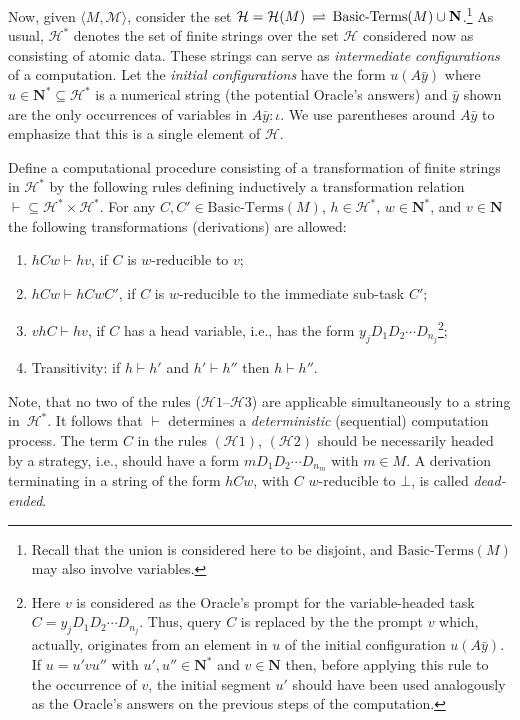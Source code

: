 \documentclass[fleqn]{LMCS}
\theoremstyle{plain}\newtheorem{satz}[thm]{Satz}
\theoremstyle{plain}\newtheorem{hyp}[thm]{Hypothesis}
\theoremstyle{plain}\newtheorem{hyps}[thm]{Hypotheses}
\theoremstyle{definition}\newtheorem{note}[thm]{Note}
\newcommand{\bYdef}{\mathrel{\BYDEF}}
\newcommand{\BYDEF}{\mbox{$\hspace{.2em}\rightleftharpoons\hspace{.2em}$}}
\newcommand{\la}{\langle}
\newcommand{\ra}{\rangle}
\newcommand{\tuple}[1]{\la #1 \ra}
\newcommand{\NN}{\mathbf{N}}
\newcommand{\MM}{{\mathcal M}}
\newcommand{\HH}{{\mathcal H}}
\newcommand{\?}{\mbox{?}}
\begin{document}
Now, given $\tuple{M,\MM}$, consider the set 
$\HH=\HH(M)\bYdef\mbox{Basic-Terms}(M)\cup\NN$.\footnote{Recall that the union is considered here to be disjoint, and 
$\mbox{Basic-Terms}(M)$ may also involve variables. 
}
As usual, $\HH^*$ denotes the set of finite strings over 
the set $\HH$ considered now as consisting of atomic data. These strings 
can serve as \emph{intermediate configurations} of a computation. 
Let the \emph{initial configurations} have the form $u(A\bar{y})$ 
where $u\in\NN^*\subseteq\HH^*$ is a numerical string (the potential Oracle's answers) 
and $\bar{y}$ shown are the only occurrences of 
variables in $A\bar{y}:\iota$. 
We use parentheses around $A\bar{y}$ 
to emphasize that this is a single element of $\HH$. 

Define a computational procedure 
consisting of a transformation of finite strings in $\HH^*$ 
by the following rules defining inductively a transformation relation 
${\vdash}\subseteq\HH^*\times\HH^*$. For any $C,C'\in\mbox{Basic-Terms}(M)$, 
$h\in\HH^*$, $w\in\NN^*$, and $v\in \NN$ the 
following transformations (derivations) are allowed: 
\begin{enumerate}[($\HH$1)]
\item $hCw\vdash hv$, if $C$ is $w$-reducible to $v$; 
\item $hCw\vdash hCwC'$, if $C$ is $w$-reducible to the immediate sub-task $C'$; 
\item $vhC\vdash hv$, if $C$ has a head variable, i.e., has the 
form $y_{j}D_1D_2\cdots D_{n_j}$\footnote{Here $v$ is considered as the Oracle's prompt for the 
variable-headed task $C=y_{j}D_1D_2\cdots D_{n_j}$. 
Thus, query $C$ is replaced by the the prompt $v$ which, actually, originates 
from an element in $u$ of the initial configuration $u(A\bar{y})$. 
If $u=u'vu''$ with $u',u''\in\NN^*$ and $v\in\NN$ then, before applying this 
rule to the occurrence of $v$, 
the initial segment $u'$ should have been used analogously as the Oracle's 
answers on the previous steps of the computation. 
}; 
\item Transitivity: if $h\vdash h'$ and $h'\vdash h''$ then 
$h\vdash h''$. 
\end{enumerate}
Note, that no two of the rules ($\HH1$--$\HH3$) are applicable 
simultaneously to a string in~$\HH^*$. It follows that $\vdash$ 
determines a \emph{deterministic} (sequential) computation process. 
The term $C$ in the rules $(\HH1)$, $(\HH2)$ should be necessarily 
headed by a strategy, i.e., should have a form 
$mD_1 D_2\cdots D_{n_m}$ with $m\in M$.
A derivation terminating in a string of the form $hCw$, 
with $C$ $w$-reducible to $\bot$, is called 
\emph{dead-ended}. 
\end{document}

